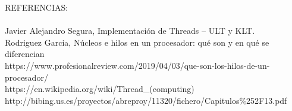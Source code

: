 \documentclass[12pt]{letter}
\begin{document}
\newpage
REFERENCIAS:\\\\
Javier Alejandro Segura, Implementación de Threads – ULT y KLT.\\
Rodriguez Garcia, Núcleos e hilos en un procesador: qué son y en qué se diferencian\\
https://www.profesionalreview.com/2019/04/03/que-son-los-hilos-de-un-procesador/\\
https://en.wikipedia.org/wiki/Thread\_(computing)\\
http://bibing.us.es/proyectos/abreproy/11320/fichero/Capitulos\%252F13.pdf
\end{document}
